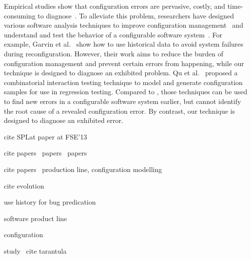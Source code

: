 Empirical studies show that configuration errors are pervasive, costly,
and time-consuming to diagnose~\cite{Yin:2011:ESC, Hubaux:2012}.
To alleviate this problem, researchers have designed various
software analysis techniques to improve configuration
management~\cite{Garvin:2011} and understand and test
the behavior of a configurable software
system~\cite{Garvin:2011, Qu:2008:CRT}.
For example, Garvin et al.~\cite{Garvin:2011} show how to
use historical data to avoid system failures during reconfiguration.
However, their work aims to reduce the burden of
configuration management and prevent certain errors from happening,
while our technique is designed to diagnose an exhibited problem.
Qu et al.~\cite{Qu:2008:CRT} proposed a combinatorial interaction
testing technique to model and generate configuration samples for
use in regression testing. Compared to \ourtool, those techniques
can be used to find new errors in
a configurable software system earlier, but cannot
identify the root cause of a revealed configuration error.
 By contrast, our technique is designed
to diagnose an exhibited error.

cite SPLat paper at FSE'13


cite papers~\cite{Huang:2013:CRL, Thummalapenta:2010:ESM, Xing:2005:UAO, r2fix}
papers~\cite{Kim:2013, Jin:2012:BRF,xray,Nguyen:2010:RBF,Dig:2006:ADR,
Apel:2009:FLA, Shang:2013:ADB, rangefix, Kamiya:2002:CMT, Staats:2011:PTO}
papers~\cite{Mostafa:2009:TPA}

cite papers~\cite{Grechanik:2009:MEG, Fischer:2005:SET, publication-8111}
production line, configuration modelling~\cite{Acher:2012:SCF}

cite evolution~\cite{Bhattacharya:2012:GAP, Nguyen:2010:GAA}

use history for bug predication~\cite{Nagappan:2006:UHI}

software product line~\cite{Bodden:2013:SLS, Kang:2005:FRL, Mende:2008:SGM, Kruger:2005:SAE}

configuration~\cite{Denaro:Self-Test:TACOS:2003, Cooray:2010:RRD, Barreiros:2009:MRC, TerBeek:2011:GCE}

study~\cite{Rabiser:2012:QSU}
cite tarantula~\cite{Jones:2002}
